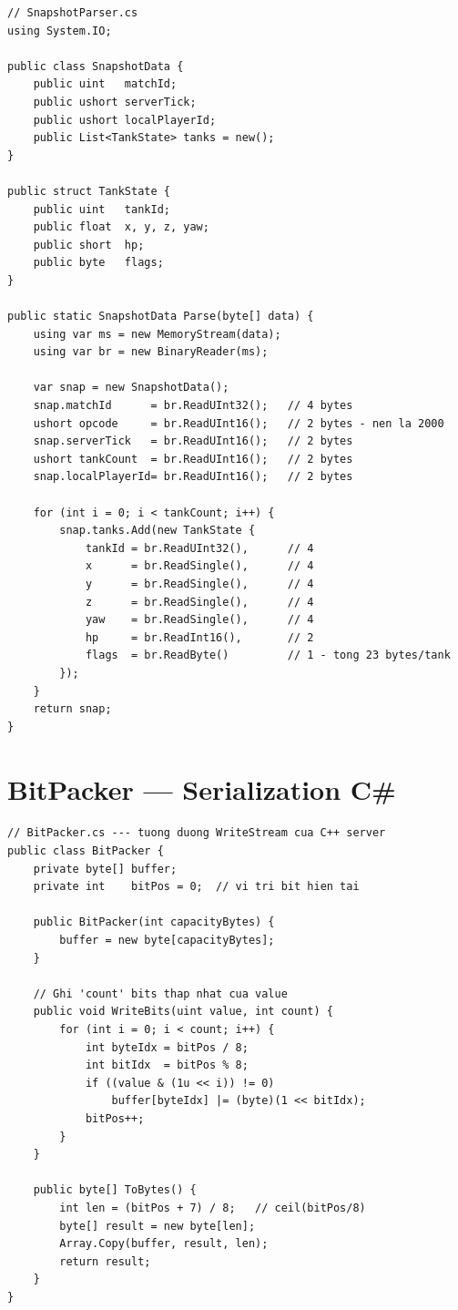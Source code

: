 \documentclass[12pt,a4paper]{report}
\begin{document}
\begin{lstlisting}[style=bashStyle, caption={Parse gói S2C\_SNAPSHOT binary (Little-Endian)}, label={lst:parsesnap}]
// SnapshotParser.cs
using System.IO;

public class SnapshotData {
    public uint   matchId;
    public ushort serverTick;
    public ushort localPlayerId;
    public List<TankState> tanks = new();
}

public struct TankState {
    public uint   tankId;
    public float  x, y, z, yaw;
    public short  hp;
    public byte   flags;
}

public static SnapshotData Parse(byte[] data) {
    using var ms = new MemoryStream(data);
    using var br = new BinaryReader(ms);

    var snap = new SnapshotData();
    snap.matchId      = br.ReadUInt32();   // 4 bytes
    ushort opcode     = br.ReadUInt16();   // 2 bytes - nen la 2000
    snap.serverTick   = br.ReadUInt16();   // 2 bytes
    ushort tankCount  = br.ReadUInt16();   // 2 bytes
    snap.localPlayerId= br.ReadUInt16();   // 2 bytes

    for (int i = 0; i < tankCount; i++) {
        snap.tanks.Add(new TankState {
            tankId = br.ReadUInt32(),      // 4
            x      = br.ReadSingle(),      // 4
            y      = br.ReadSingle(),      // 4
            z      = br.ReadSingle(),      // 4
            yaw    = br.ReadSingle(),      // 4
            hp     = br.ReadInt16(),       // 2
            flags  = br.ReadByte()         // 1 - tong 23 bytes/tank
        });
    }
    return snap;
}
\end{lstlisting}

\section{BitPacker --- Serialization C\#}

\begin{lstlisting}[style=bashStyle, caption={Triển khai BitPacker trong Unity (C#)}, label={lst:bitpacker}]
// BitPacker.cs --- tuong duong WriteStream cua C++ server
public class BitPacker {
    private byte[] buffer;
    private int    bitPos = 0;  // vi tri bit hien tai

    public BitPacker(int capacityBytes) {
        buffer = new byte[capacityBytes];
    }

    // Ghi 'count' bits thap nhat cua value
    public void WriteBits(uint value, int count) {
        for (int i = 0; i < count; i++) {
            int byteIdx = bitPos / 8;
            int bitIdx  = bitPos % 8;
            if ((value & (1u << i)) != 0)
                buffer[byteIdx] |= (byte)(1 << bitIdx);
            bitPos++;
        }
    }

    public byte[] ToBytes() {
        int len = (bitPos + 7) / 8;   // ceil(bitPos/8)
        byte[] result = new byte[len];
        Array.Copy(buffer, result, len);
        return result;
    }
}
\end{lstlisting}
\end{document}
